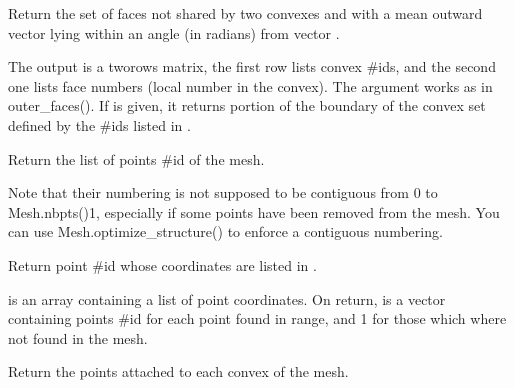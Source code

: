 \documentclass[a4paper,11pt,english]{sphinxmanual}
\begin{document}
\begin{fulllineitems}
\begin{fulllineitems}
Return the set of faces not shared by two convexes and with a mean outward vector lying within an angle  (in radians) from vector .

The output  is a two\sphinxhyphen{}rows matrix, the first row lists convex
\#ids, and the second one lists face numbers (local number in the
convex). The argument  works as in outer\_faces().
If  is given, it returns portion of the boundary of
the convex set defined by the \#ids listed in .

\end{fulllineitems}


\begin{fulllineitems}
\label{\detokenize{python/cmdref_Mesh:getfem.Mesh.pid}}
Return the list of points \#id of the mesh.

Note that their numbering is not supposed to be contiguous from
0 to Mesh.nbpts()\sphinxhyphen{}1,
especially if some points have been removed from the mesh. You
can use Mesh.optimize\_structure() to enforce a contiguous
numbering.

\end{fulllineitems}


\begin{fulllineitems}
\label{\detokenize{python/cmdref_Mesh:getfem.Mesh.pid_from_coords}}
Return point \#id whose coordinates are listed in .

 is an array containing a list of point coordinates. On
return,  is a vector containing points
\#id for each point found in  range, and \sphinxhyphen{}1 for those
which where not found in the mesh.

\end{fulllineitems}


\begin{fulllineitems}
\label{\detokenize{python/cmdref_Mesh:getfem.Mesh.pid_from_cvid}}
Return the points attached to each convex of the mesh.


\end{fulllineitems}
\end{fulllineitems}
\end{document}
